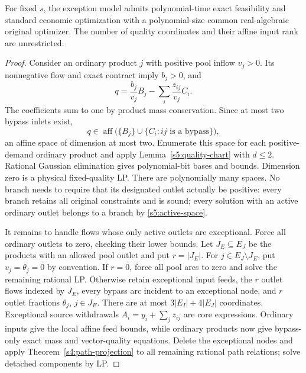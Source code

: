 \begin{theorem}
\label{s5:arbitrary-exceptions}
For fixed $s$, the exception model admits polynomial-time exact
feasibility and standard economic optimization with a polynomial-size
common real-algebraic original optimizer. The number of quality
coordinates and their affine input rank are unrestricted.
\end{theorem}
\begin{proof}
Consider an ordinary product $j$ with positive pool inflow $v_j>0$.
Its nonnegative flow and exact contract imply $b_j>0$, and
\[
 q=\frac{b_j}{v_j}B_j-\sum_i\frac{z_{ij}}{v_j}C_i.
\]
The coefficients sum to one by product mass conservation. Since at most
two bypass inlets exist,
\begin{equation}
 q\in\operatorname{aff}\bigl(\{B_j\}\cup
                    \{C_i:ij\text{ is a bypass}\}\bigr),
 \label{s5:active-space}
\end{equation}
an affine space of dimension at most two. Enumerate this space for each
positive-demand ordinary product and apply
Lemma~\ref{s5:quality-chart} with $d\le2$. Rational Gaussian elimination
gives polynomial-bit bases and bounds. Dimension zero is a physical
fixed-quality LP. There are polynomially many spaces. No branch needs
to require that its designated outlet actually be positive: every
branch retains all original constraints and is sound; every solution
with an active ordinary outlet belongs to a branch by
\eqref{s5:active-space}.

It remains to handle flows whose only active outlets are exceptional.
Force all ordinary outlets to zero, checking their lower bounds.
Let $J_E\subseteq E_J$ be the products with an allowed pool outlet and
put $r=|J_E|$. For $j\in E_J\setminus J_E$, put $v_j=\theta_j=0$
by convention. If $r=0$, force all pool arcs to zero and solve the
remaining rational LP. Otherwise retain exceptional input feeds, the
$r$ outlet flows indexed by $J_E$, every bypass arc incident to an
exceptional node, and $r$ outlet fractions $\theta_j$, $j\in J_E$.
There are at most $3|E_I|+4|E_J|$ coordinates. Exceptional source
withdrawals $A_i=y_i+\sum_jz_{ij}$ are core expressions. Ordinary
inputs give the local affine feed bounds, while ordinary products now
give bypass-only exact mass and vector-quality equations. Delete the
exceptional nodes and apply Theorem~\ref{s4:path-projection} to all
remaining rational path relations; solve detached components by LP.


\end{proof}
